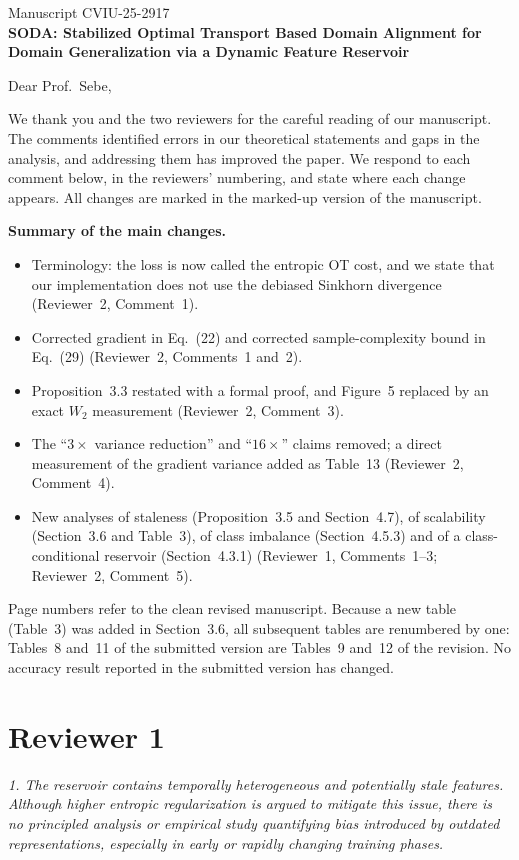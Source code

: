 \documentclass[11pt]{article}
\newenvironment{comment}{\par\medskip\noindent\begin{minipage}{\linewidth}\color{revcol}\itshape}{\end{minipage}\par\smallskip}
\begin{document}
\noindent Manuscript CVIU-25-2917\\
\textbf{SODA: Stabilized Optimal Transport Based Domain Alignment for Domain Generalization via a Dynamic Feature Reservoir}

\bigskip
\noindent Dear Prof.\ Sebe,

\noindent We thank you and the two reviewers for the careful reading of our manuscript. The comments identified errors in our theoretical statements and gaps in the analysis, and addressing them has improved the paper. We respond to each comment below, in the reviewers' numbering, and state where each change appears. All changes are marked in the marked-up version of the manuscript.

\noindent \textbf{Summary of the main changes.}
\begin{itemize}
  \item Terminology: the loss is now called the entropic OT cost, and we state that our implementation does not use the debiased Sinkhorn divergence (Reviewer~2, Comment~1).
  \item Corrected gradient in Eq.~(22) and corrected sample-complexity bound in Eq.~(29) (Reviewer~2, Comments~1 and~2).
  \item Proposition~3.3 restated with a formal proof, and Figure~5 replaced by an exact $W_2$ measurement (Reviewer~2, Comment~3).
  \item The ``$3\times$ variance reduction'' and ``$16\times$'' claims removed; a direct measurement of the gradient variance added as Table~13 (Reviewer~2, Comment~4).
  \item New analyses of staleness (Proposition~3.5 and Section~4.7), of scalability (Section~3.6 and Table~3), of class imbalance (Section~4.5.3) and of a class-conditional reservoir (Section~4.3.1) (Reviewer~1, Comments~1--3; Reviewer~2, Comment~5).
\end{itemize}
\noindent Page numbers refer to the clean revised manuscript. Because a new table (Table~3) was added in Section~3.6, all subsequent tables are renumbered by one: Tables~8 and~11 of the submitted version are Tables~9 and~12 of the revision. No accuracy result reported in the submitted version has changed.

\bigskip
\section*{Reviewer 1}

\begin{comment}
1. The reservoir contains temporally heterogeneous and potentially stale features. Although higher entropic regularization is argued to mitigate this issue, there is no principled analysis or empirical study quantifying bias introduced by outdated representations, especially in early or rapidly changing training phases.
\end{comment}
\end{document}
